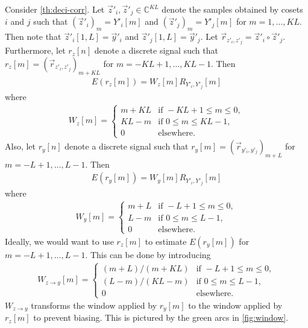 \documentclass[a4paper, openany, oneside]{memoir}
\begin{document}
Consider \cref{th:deci-corr}. Let $\vec{z}'_i, \vec{z}'_j \in \mathbb{C}^{KL}$ denote the samples obtained by cosets $i$ and $j$ such that $(\vec{z}'_i)_m = Y'_i[m]$ and $(\vec{z}'_j)_m=Y'_j[m]$ for $m = 1,\ldots,KL$. Then note that $\vec{z}'_i[1,L]=\vec{y}'_i$ and $\vec{z}'_j[1,L]=\vec{y}'_j$. Let $\vec{r}_{z'_i,z'_j} = \vec{z}'_i \circ \vec{z}'_j$. Furthermore, let $r_z[n]$ denote a discrete signal such that $r_z[m] = (\vec{r}_{z'_i,z'_j})_{m+KL}$ for $m = -KL+1,\ldots,KL-1$. Then
\begin{align*}
    E(r_z[m]) = W_z[m]R_{Y'_i,Y'_j}[m]
\end{align*}
where
\begin{align*}
    W_z[m] = \begin{cases}
        m + KL & \text{if } -KL + 1 \le m \le 0, \\
        KL - m & \text{if } 0 \le m \le KL - 1, \\
        0 & \text{elsewhere.}
    \end{cases}
\end{align*}
Also, let $r_y[n]$ denote a discrete signal such that $r_y[m] = (\vec{r}_{y'_i,y'_j})_{m+L}$ for $m = -L+1,\ldots,L-1$. Then
\begin{align*}
    E(r_y[m]) = W_y[m]R_{Y'_i,Y'_j}[m]
\end{align*}
where
\begin{align*}
    W_y[m] = \begin{cases}
        m + L & \text{if } -L+1 \le m \le 0, \\
        L - m & \text{if } 0 \le m \le L - 1, \\
        0 & \text{elsewhere.}
    \end{cases}
\end{align*}
Ideally, we would want to use $r_z[m]$ to estimate $E(r_y[m])$ for $m = -L+1,\ldots,L-1$. This can be done by introducing
\begin{align*}
    W_{z \to y}[m] = \begin{cases}
        (m + L)/(m + KL) & \text{if } -L+1 \le m \le 0, \\
        (L - m)/(KL - m) & \text{if } 0 \le m \le L - 1, \\
        0 & \text{elsewhere.}
    \end{cases}
\end{align*}
$W_{z \to y}$ transforms the window applied by $r_y[m]$ to the window applied by $r_z[m]$ to prevent biasing. This is pictured by the green arcs in \cref{fig:window}.
\end{document}
